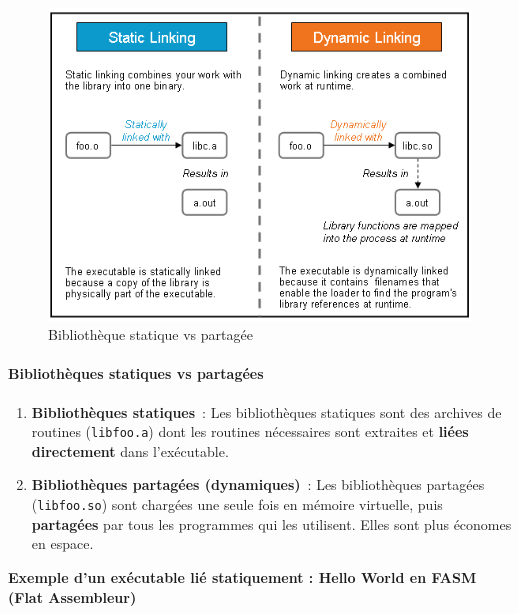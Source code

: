 \begin{figure}[H]
  \centering
  \includegraphics[width=1\textwidth]{images_pfe/sharedlibraryvsstatic.png}
  \caption{Bibliothèque statique vs partagée}
  \label{fig:staticsharedl}
\end{figure}

\paragraph{Bibliothèques statiques vs partagées}
\begin{enumerate}
  \item \textbf{Bibliothèques statiques} :  
    Les bibliothèques statiques sont des archives de routines (\texttt{libfoo.a}) dont les routines nécessaires sont extraites et \textbf{liées directement} dans l’exécutable.  
  \item \textbf{Bibliothèques partagées (dynamiques)} :  
    Les bibliothèques partagées (\texttt{libfoo.so}) sont chargées une seule fois en mémoire virtuelle, puis \textbf{partagées} par tous les programmes qui les utilisent. Elles sont plus économes en espace.\\
\end{enumerate}





\textbf{Exemple d'un exécutable lié statiquement : Hello World en FASM (Flat Assembleur)}

